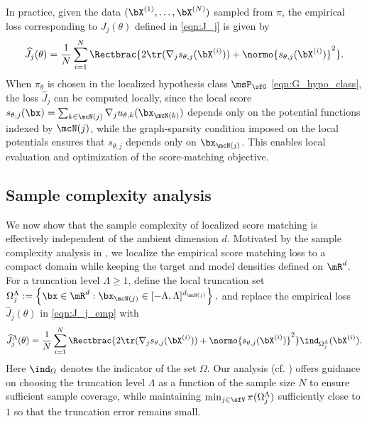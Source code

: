 \documentclass[11pt]{article}
\begin{document}
In practice, given the data $(\bX^{(1)},\dots,\bX^{(N)})$ sampled from $\pi$, the empirical loss corresponding to $J_j(\theta)$ defined in \eqref{eqn:J_j} is given by
\begin{equation}
\label{eqn:J_j_emp}
    \widehat{J}_j(\theta) = \frac{1}{N} \sum_{i=1}^N \Rectbrac{ 2 \tr ( \nabla_j s_{\theta,j} (\bX^{(i)}) ) + \normo{s_{\theta,j}(\bX^{(i)})}^2  }.
\end{equation} 
When $\pi_\theta$ is chosen in the localized hypothesis class $\msP_\sfG$ \eqref{eqn:G_hypo_class}, the loss $\widehat{J}_j$ can be computed locally, since the local score
\(
    s_{\theta,j}(\bx) = \sum_{k \in \mcN(j)} \nabla_j u_{\theta,k}(\bx_{\mcN(k)})
\)
depends only on the potential functions indexed by $\mcN(j)$, while the graph-sparsity condition imposed on the local potentials ensures that $s_{\theta,j}$ depends only on $\bx_{\mcN(j)}$. This enables local evaluation and optimization of the score-matching objective.





\subsection{Sample complexity analysis}
\label{sec:LSM_samplecomplexity}

We now show that the sample complexity of localized score matching is effectively independent of the ambient dimension $d$.
%
Motivated by the sample complexity analysis in \cite{pmlr-v202-oko23a,pmlr-v247-wibisono24a}, we localize the empirical score matching loss to a compact domain while keeping the target and model densities defined on $\mR^d$.
For a truncation level $\Lambda\ge1$, define the local truncation set
\(
    \Omega_j^\Lambda := \left\{ \bx\in\mR^d : \bx_{\mcN(j)}\in[-\Lambda,\Lambda]^{d_{\mcN(j)}} \right\},
\)
and replace the empirical loss $\widehat{J}_j(\theta)$ in \eqref{eqn:J_j_emp} with
\begin{equation}
\label{eqn:J_j_trunc}
    \widehat{J}_j^\Lambda(\theta)
    =
    \frac{1}{N} \sum_{i=1}^N \Rectbrac{ 2 \tr ( \nabla_j s_{\theta,j} (\bX^{(i)}) ) + \normo{s_{\theta,j}(\bX^{(i)})}^2  }
    \ind_{\Omega_j^\Lambda}(\bX^{(i)}).
\end{equation}
Here $\ind_\Omega$ denotes the indicator of the set $\Omega$.
Our analysis (cf. ) offers guidance on choosing the truncation level $\Lambda$ as a function of the sample size $N$ to ensure sufficient sample coverage, while maintaining $\min_{j\in\sfV} \pi(\Omega_j^\Lambda)$ sufficiently close to $1$ so that the truncation error remains small.
\end{document}
